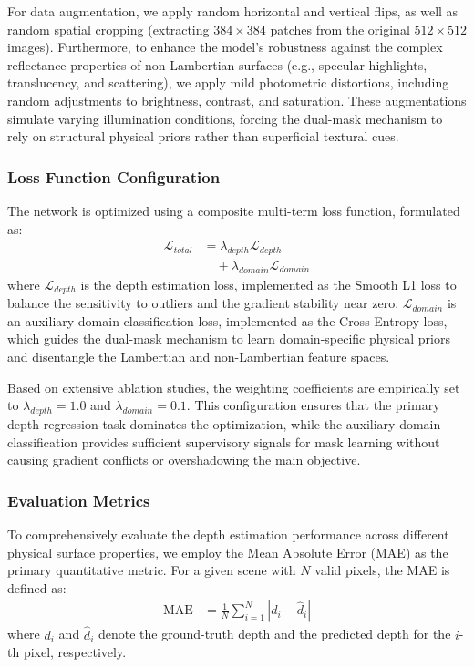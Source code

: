 \documentclass[lettersize,journal]{IEEEtran}
\begin{document}
For data augmentation, we apply random horizontal and vertical flips, as well as random spatial cropping (extracting $384 \times 384$ patches from the original $512 \times 512$ images). Furthermore, to enhance the model's robustness against the complex reflectance properties of non-Lambertian surfaces (e.g., specular highlights, translucency, and scattering), we apply mild photometric distortions, including random adjustments to brightness, contrast, and saturation. These augmentations simulate varying illumination conditions, forcing the dual-mask mechanism to rely on structural physical priors rather than superficial textural cues.

\subsubsection{Loss Function Configuration}
The network is optimized using a composite multi-term loss function, formulated as:
\begin{equation}
\begin{aligned}
\mathcal{L}_{total} &= \lambda_{depth} \mathcal{L}_{depth} \\
&\quad + \lambda_{domain} \mathcal{L}_{domain}
\end{aligned}
\end{equation}
where $\mathcal{L}_{depth}$ is the depth estimation loss, implemented as the Smooth L1 loss to balance the sensitivity to outliers and the gradient stability near zero. $\mathcal{L}_{domain}$ is an auxiliary domain classification loss, implemented as the Cross-Entropy loss, which guides the dual-mask mechanism to learn domain-specific physical priors and disentangle the Lambertian and non-Lambertian feature spaces. 

Based on extensive ablation studies, the weighting coefficients are empirically set to $\lambda_{depth} = 1.0$ and $\lambda_{domain} = 0.1$. This configuration ensures that the primary depth regression task dominates the optimization, while the auxiliary domain classification provides sufficient supervisory signals for mask learning without causing gradient conflicts or overshadowing the main objective.

\subsubsection{Evaluation Metrics}
To comprehensively evaluate the depth estimation performance across different physical surface properties, we employ the Mean Absolute Error (MAE) as the primary quantitative metric. For a given scene with $N$ valid pixels, the MAE is defined as:
\begin{equation}
\begin{aligned}
\text{MAE} &= \frac{1}{N} \sum_{i=1}^{N} |d_i - \hat{d}_i|
\end{aligned}
\end{equation}
where $d_i$ and $\hat{d}_i$ denote the ground-truth depth and the predicted depth for the $i$-th pixel, respectively. 
\end{document}
